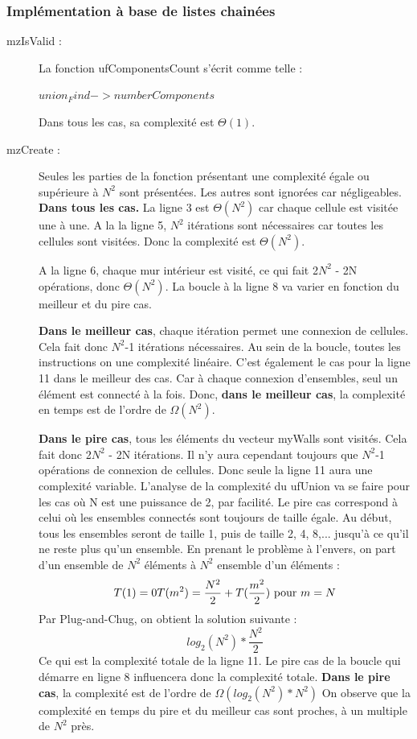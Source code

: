 \documentclass[10pt]{article}
\begin{document}
\subsubsection{Implémentation à base de listes chainées}
\begin{description}
\item[mzIsValid :]La fonction ufComponentsCount s'écrit comme telle :
\begin{codebox}
\li \Return $union_Find->numberComponents$
\end{codebox}
Dans tous les cas, sa complexité est $\Theta(1)$.



\item[mzCreate :] Seules les parties de la fonction présentant une complexité égale ou supérieure à $N^{2}$ sont présentées. Les autres sont ignorées car négligeables. \textbf{Dans tous les cas.} La ligne 3 est $\Theta(N^{2})$ car chaque cellule est visitée une à une. A la la ligne 5, $N^{2}$ itérations sont nécessaires car toutes les cellules sont visitées. Donc la complexité est $\Theta(N^{2})$.

A la ligne 6, chaque mur intérieur est visité, ce qui fait 2$N^{2}$ - 2N opérations, donc $\Theta(N^{2})$.
La boucle à la ligne 8 va varier en fonction du meilleur et du pire cas. 

\textbf{Dans le meilleur cas}, chaque itération permet une connexion de cellules. Cela fait donc $N^{2}$-1 itérations nécessaires. Au sein de la boucle, toutes les instructions on une complexité linéaire. C'est également le cas pour la ligne 11 dans le meilleur des cas. Car à chaque connexion d'ensembles, seul un élément est connecté à la fois. Donc,\textbf{ dans le meilleur cas}, la complexité en temps est de l'ordre de $\Omega(N^{2})$. 

\textbf{Dans le pire cas}, tous les éléments du vecteur myWalls sont visités. Cela fait donc 2$N^{2}$ - 2N  itérations. Il n'y aura cependant toujours que $N^{2}$-1 opérations de connexion de cellules. Donc seule la ligne 11 aura une complexité variable. L'analyse de la complexité du ufUnion va se faire pour les cas où N est une puissance de 2, par facilité. Le pire cas correspond à celui où les ensembles connectés sont toujours de taille égale. Au début, tous les ensembles seront de taille 1, puis de taille 2, 4, 8,... jusqu'à ce qu'il ne reste plus qu'un ensemble. En prenant le problème à l'envers, on part d'un ensemble de $N^{2}$ éléments à $N^{2}$ ensemble d'un éléments :
\begin{equation}
	T(1) = 0
	T(m^{2}) = \frac{N^{2}}{2} + T(\frac{m^{2}}{2}) $ pour $ m = N
\end{equation}
Par Plug-and-Chug, on obtient la solution suivante :
\begin{equation}
	log_{2} (N^{2}) * \frac{N^{2}}{2}
\end{equation}
Ce qui est la complexité totale de la ligne 11.
Le pire cas de la boucle qui démarre en ligne 8 influencera donc la complexité totale.
\textbf{Dans le pire cas}, la complexité est de l'ordre de $\Omega(log_{2} (N^{2})*N^{2})$
On observe que la complexité en temps du pire et du meilleur cas sont proches, à un multiple de $N^{2}$ près.
\end{description}
\newpage 
\end{document}
